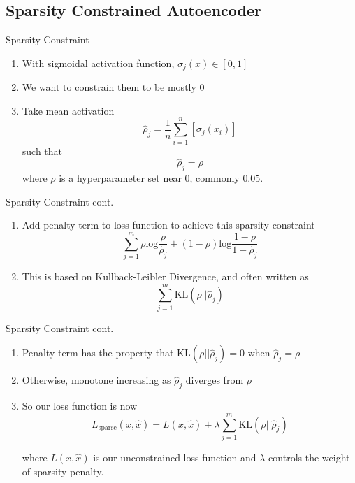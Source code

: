 \documentclass[pdf]{beamer}
\begin{document}
\subsection{Sparsity Constrained Autoencoder}	
		\begin{frame}{Sparsity Constraint}
		\begin{enumerate}
			\item With sigmoidal activation function,  $\sigma_j(x) \in [0, 1]$
			\item We want to constrain them to be mostly $0$ 	
			\item Take mean activation
			$$ \hat{\rho}_j = \frac{1}{n} \sum_{i = 1}^{n} \left[\sigma_j\left(x_i\right)\right] $$
			such that 
			$$\hat{\rho}_j = \rho$$
			where $\rho$ is a hyperparameter set near $0$, commonly $0.05$.
		\end{enumerate}
		\end{frame}
		
		
		\begin{frame}{Sparsity Constraint cont.}
		\begin{enumerate}
			\item Add penalty term to loss function to achieve this sparsity constraint	
			$$ \sum_{j= 1}^{m} \rho \text{log} \frac{\rho}{\hat{\rho}_j} + (1 - \rho) \text{log} \frac{1 - \rho}{1 - \hat{\rho}_j} $$
			
			\item This is based on Kullback-Leibler Divergence, and often written as
			$$  \sum_{j= 1}^{m} \text{KL} \left(\rho || \hat{\rho}_j \right)   $$
		
		\end{enumerate}
		\end{frame}
		
		
		\begin{frame}{Sparsity Constraint cont.}
		\begin{enumerate}
			\item Penalty term has the property that $ \text{KL} \left(\rho || \hat{\rho}_j \right) = 0$ when $\hat{\rho}_j = \rho$
			\item Otherwise, monotone increasing as 	$\hat{\rho}_j$ diverges from $\rho$ 
			\item So our loss function is now
			$$ L_{\text{sparse}}(x, \hat{x}) = L(x, \hat{x}) + \lambda  \sum_{j= 1}^{m} \text{KL} \left(\rho || \hat{\rho}_j \right)  $$
			
			where $L(x, \hat{x})$ is our unconstrained loss function and $\lambda$  controls the weight of sparsity penalty.
		\end{enumerate}
		\end{frame}
		
\end{document}
